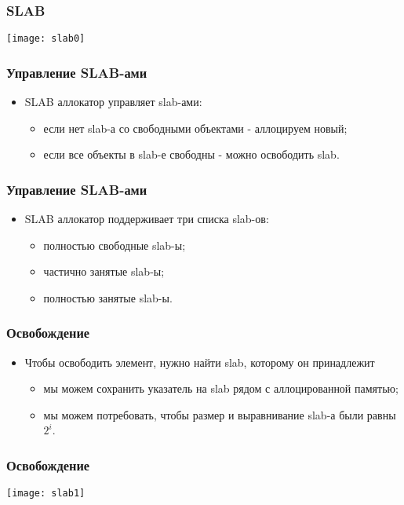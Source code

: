 \begin{frame}
\frametitle{SLAB}
\texttt{[image: slab0]}
\end{frame}

\begin{frame}
\frametitle{Управление SLAB-ами}
\begin{itemize}
    \item<1->SLAB аллокатор управляет slab-ами:
    \begin{itemize}
        \item<2->если нет slab-а со свободными объектами - аллоцируем новый;
        \item<3->если все объекты в slab-е свободны - можно освободить slab.
    \end{itemize}
\end{itemize}
\end{frame}

\begin{frame}
\frametitle{Управление SLAB-ами}
\begin{itemize}
    \item<1->SLAB аллокатор поддерживает три списка slab-ов:
    \begin{itemize}
        \item<2->полностью свободные slab-ы;
        \item<3->частично занятые slab-ы;
        \item<4->полностью занятые slab-ы.
    \end{itemize}
\end{itemize}
\end{frame}

\begin{frame}
\frametitle{Освобождение}
\begin{itemize}
    \item<1->Чтобы освободить элемент, нужно найти slab, которому он принадлежит
    \begin{itemize}
        \item<2->мы можем сохранить указатель на slab рядом с аллоцированной
        памятью;
        \item<3->мы можем потребовать, чтобы размер и выравнивание slab-а были
        равны $2^i$.
    \end{itemize}
\end{itemize}
\end{frame}

\begin{frame}
\frametitle{Освобождение}
\texttt{[image: slab1]}
\end{frame}

